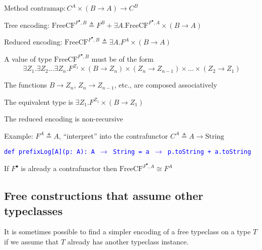 Method $\text{contramap}:C^{A}\times\left(B\rightarrow A\right)\rightarrow C^{B}$ 

Tree encoding: $\text{FreeCF}^{F^{\bullet},B}\triangleq F^{B}+\exists A.\text{FreeCF}^{F^{\bullet},A}\times\left(B\rightarrow A\right)$

Reduced encoding: $\text{FreeCF}^{F^{\bullet},B}\triangleq\exists A.F^{A}\times\left(B\rightarrow A\right)$ 

A value of type $\text{FreeCF}^{F^{\bullet},B}$ must be of the form
{\footnotesize{}
\[
\exists Z_{1}.\exists Z_{2}...\exists Z_{n}.F^{Z_{1}}\times\left(B\rightarrow Z_{n}\right)\times\left(Z_{n}\rightarrow Z_{n-1}\right)\times...\times\left(Z_{2}\rightarrow Z_{1}\right)
\]
}{\footnotesize\par}

The functions $B\rightarrow Z_{n}$, $Z_{n}\rightarrow Z_{n-1}$,
etc., are composed associatively

The equivalent type is $\exists Z_{1}.F^{Z_{1}}\times\left(B\rightarrow Z_{1}\right)$

The reduced encoding is non-recursive

Example: $F^{A}\triangleq A$, \textsf{``}interpret\textsf{''} into the contrafunctor
$C^{A}\triangleq A\rightarrow\text{String}$

\texttt{\textcolor{blue}{\footnotesize{}def prefixLog{[}A{]}(p: A): A
$\rightarrow$ String = a $\rightarrow$ p.toString + a.toString}}{\footnotesize\par}

If $F^{\bullet}$ is already a contrafunctor then $\text{FreeCF}^{F^{\bullet},A}\cong F^{A}$

\subsection{Free constructions that assume other typeclasses}

It is sometimes possible to find a simpler encoding of a free typeclass
on a type $T$ if we assume that $T$ already has another typeclass
instance.

